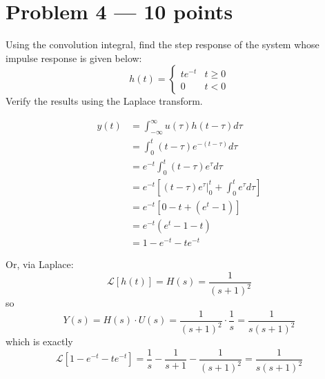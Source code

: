 \documentclass[12pt]{article}
\renewcommand{\L}{\mathcal{L}}
\begin{document}
\section*{Problem 4 --- 10 points}
    Using the convolution integral, find the step response of the system whose impulse response is given below:
    \[
        h(t) = \begin{cases} 
            t e^{-t} & t \geq 0 \\ 
            0 & t < 0 
        \end{cases}
    \]
    Verify the results using the Laplace transform.

    \color{darkblue}
        \begin{align*}
            y(t) &= \int_{-\infty}^{\infty} u(\tau) h(t - \tau) d\tau \\
            &= \int_{0}^{t} (t - \tau) e^{-(t - \tau)} d\tau \\
            &= e^{-t} \int_{0}^{t} (t - \tau) e^{\tau} d\tau \\
            &= e^{-t} \left[ (t - \tau) e^{\tau} \Big|_{0}^{t} + \int_{0}^{t} e^{\tau} d\tau \right] \\
            &= e^{-t} \left[ 0 - t + (e^{t} - 1) \right] \\
            &= e^{-t} (e^{t} - 1 - t) \\
            &= \boxed{1 - e^{-t} - t e^{-t}}
        \end{align*}

        Or, via Laplace:
        \[\L[h(t)] = H(s) = \frac{1}{(s+1)^2}\]
        so 
        \[Y(s) = H(s) \cdot U(s) = \frac{1}{(s+1)^2} \cdot \frac{1}{s} = \frac{1}{s(s+1)^2}\]
        which is exactly 
        \[\L[ 1 - e^{-t} - t e^{-t}] = \frac{1}{s} -\frac{1}{s + 1} - \frac{1}{(s+1)^2} = \frac{1}{s(s+1)^2}\]
    \color{black}
\end{document}
